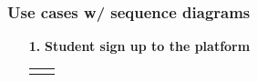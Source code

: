 \documentclass{article}
\begin{document}
{\begin{itemize}
            \end{itemize}
        \subsubsection{Use cases w/ sequence diagrams}
            \begin{enumerate}
                \item[\textbf{1.}] \textbf{Student sign up to the platform}

                    \begin{xltabular}{\textwidth}
                        {| >{\raggedright\arraybackslash}g | >{\raggedright\arraybackslash}X |}      
                        \hline
                        \endfirsthead
                        \hline
                        \endhead
                        \endfoot
                        \hline
                        \endlastfoot
                        

                        
                        

\end{xltabular}
\end{enumerate}}
\end{document}

